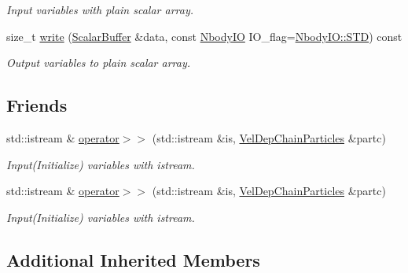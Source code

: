 \begin{DoxyCompactItemize}
\begin{DoxyCompactList}\small\item\em Input variables with plain scalar array. \end{DoxyCompactList}\item 
size\+\_\+t \mbox{\hyperlink{class_space_h_1_1_vel_dep_chain_particles_a469e7b3374c6a0067ebaa81a66d9b7d2}{write}} (\mbox{\hyperlink{class_space_h_1_1_vel_indep_particles_abca40159a816385790d5a6fd19c1dc6d}{Scalar\+Buffer}} \&data, const \mbox{\hyperlink{namespace_space_h_a296a8bae763a754564bfdce216e31b59}{Nbody\+IO}} I\+O\+\_\+flag=\mbox{\hyperlink{namespace_space_h_a296a8bae763a754564bfdce216e31b59ac6ce23be5d350ce18a665427d2d950f7}{Nbody\+I\+O\+::\+S\+TD}}) const
\begin{DoxyCompactList}\small\item\em Output variables to plain scalar array. \end{DoxyCompactList}\end{DoxyCompactItemize}
\subsection*{Friends}
\begin{DoxyCompactItemize}
\item 
std\+::istream \& \mbox{\hyperlink{class_space_h_1_1_vel_dep_chain_particles_aa49e7bdbd28850629b79699eadb04d9c}{operator$>$$>$}} (std\+::istream \&is, \mbox{\hyperlink{class_space_h_1_1_vel_dep_chain_particles}{Vel\+Dep\+Chain\+Particles}} \&partc)
\begin{DoxyCompactList}\small\item\em Input(\+Initialize) variables with istream. \end{DoxyCompactList}\item 
std\+::istream \& \mbox{\hyperlink{class_space_h_1_1_vel_dep_chain_particles_aa49e7bdbd28850629b79699eadb04d9c}{operator$>$$>$}} (std\+::istream \&is, \mbox{\hyperlink{class_space_h_1_1_vel_dep_chain_particles}{Vel\+Dep\+Chain\+Particles}} \&partc)
\begin{DoxyCompactList}\small\item\em Input(\+Initialize) variables with istream. \end{DoxyCompactList}\end{DoxyCompactItemize}
\subsection*{Additional Inherited Members}


